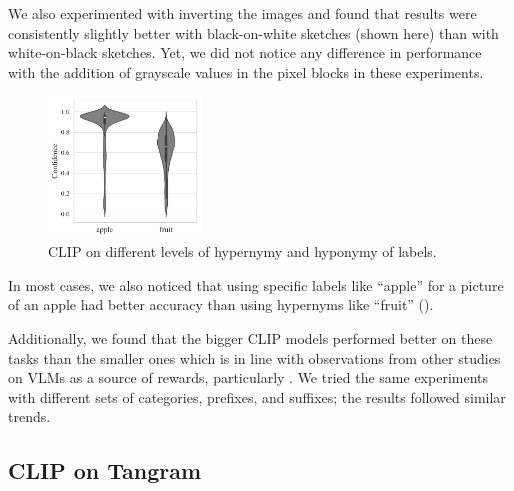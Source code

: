 We also experimented with inverting the images and found that results were consistently slightly better with black-on-white sketches (shown here) than with white-on-black sketches.
Yet, we did not notice any difference in performance with the addition of grayscale values in the pixel blocks in these experiments.

\begin{figure}
    \centering
    \includegraphics[width=0.36\textwidth]{images/hypercategory_comparison_2.pdf}
    \caption{CLIP on different levels of hypernymy and hyponymy of labels.}
    \label{fig:clip-hypercategory}
\end{figure}
In most cases, we also noticed that using specific labels like ``apple'' for a picture of an apple had better accuracy than using hypernyms like ``fruit'' ().

Additionally, we found that the bigger CLIP models performed better on these tasks than the smaller ones which is in line with observations from other studies on VLMs as a source of rewards, particularly \cite{vlmrm}.
We tried the same experiments with different sets of categories, prefixes, and suffixes; the results followed similar trends.

\subsection{CLIP on Tangram}
\label{sec:clip-tangram}

